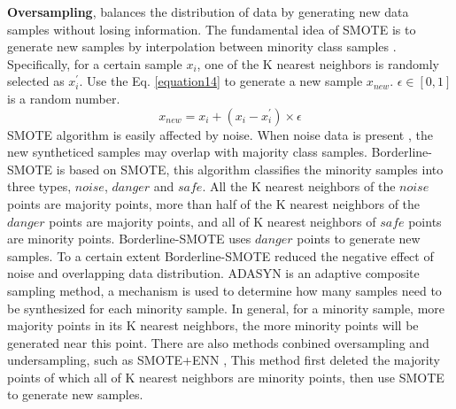 \documentclass[runningheads]{llncs}
\begin{document}
\textbf{Oversampling}, balances the distribution of data 
by generating new data samples without losing information.
The fundamental idea of SMOTE is to generate new samples by interpolation between minority class samples \cite{2018SMOTE}.
Specifically, for a certain sample $x_i$, one of the K nearest neighbors is randomly selected as $x_i ^{'}$.
Use the Eq. \ref{equation14} to generate a new sample $x_{new}$. $\epsilon \in [0,1]$ is a random number.
\begin{equation}
  \label{equation14}
  x_{new}=x_i+(x_i-x_i^{'})\times \epsilon
\end{equation}
 SMOTE algorithm is easily affected by noise.
When noise data is present
, the new syntheticed samples may overlap with majority class samples.
Borderline-SMOTE \cite{2005Borderline} is based on SMOTE, this algorithm classifies
the minority samples into three types, 
$noise$, $danger$ and $safe$.
All the K nearest neighbors of the $noise$ points are majority points, 
more than half of the K nearest neighbors 
of the $danger$ points are majority points, 
and all of K nearest neighbors of $safe$ points are minority points.
Borderline-SMOTE uses $danger$ points to generate new samples.
To a certain extent Borderline-SMOTE reduced the negative effect of noise and overlapping data distribution.
ADASYN \cite{2008ADASYN} is an adaptive composite sampling method, 
a mechanism is used to determine how many samples need to be synthesized for each minority sample.
In general, for a minority sample, more majority points in its K nearest neighbors, 
the more minority points will be generated near this point.
There are also methods conbined oversampling and undersampling, such as SMOTE+ENN \cite{2019Electrocardiogram},
This method first deleted the majority points of which all of K nearest neighbors are minority points,
then use SMOTE to generate new samples.
\end{document}
